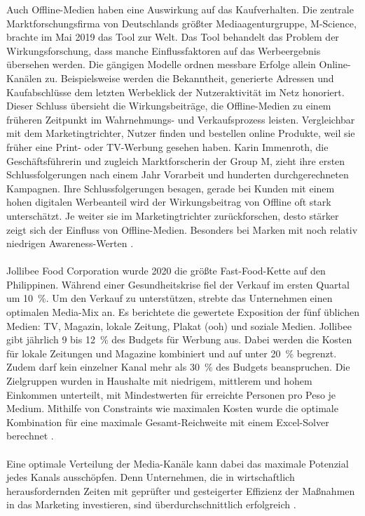 Auch Offline-Medien haben eine Auswirkung auf das Kaufverhalten. Die zentrale Marktforschungsfirma von Deutschlands größter Mediaagenturgruppe, M-Science, brachte im Mai 2019 das Tool  zur Welt. Das Tool behandelt das Problem der Wirkungsforschung, dass manche Einflussfaktoren auf das Werbeergebnis übersehen werden. Die gängigen Modelle ordnen messbare Erfolge allein Online-Kanälen zu. Beispielsweise werden die Bekanntheit, generierte Adressen und Kaufabschlüsse dem letzten Werbeklick der Nutzeraktivität im Netz honoriert. Dieser Schluss übersieht die Wirkungsbeiträge, die Offline-Medien zu einem früheren Zeitpunkt im Wahrnehmungs- und Verkaufsprozess leisten. Vergleichbar mit dem Marketingtrichter, Nutzer finden und bestellen online Produkte, weil sie früher eine Print- oder TV-Werbung gesehen haben. Karin Immenroth, die Geschäftsführerin und zugleich Marktforscherin der Group M, zieht ihre ersten Schlussfolgerungen nach einem Jahr Vorarbeit und hunderten durchgerechneten Kampagnen. Ihre Schlussfolgerungen besagen, gerade bei Kunden mit einem hohen digitalen Werbeanteil wird der Wirkungsbeitrag von Offline oft stark unterschätzt. Je weiter sie im Marketingtrichter zurückforschen, desto stärker zeigt sich der Einfluss von Offline-Medien. Besonders bei Marken mit noch relativ niedrigen Awareness-Werten \cite[S. 4]{20190411492848}.
\\\\
Jollibee Food Corporation wurde 2020 die größte Fast-Food-Kette auf den Philippinen. Während einer Gesundheitskrise fiel der Verkauf im ersten Quartal um 10~\%. Um den Verkauf zu unterstützen, strebte das Unternehmen einen optimalen Media-Mix an. Es berichtete die gewertete Exposition der fünf üblichen Medien: TV, Magazin, lokale Zeitung, Plakat (\ac{ooh}) und soziale Medien. Jollibee gibt jährlich 9 bis 12~\% des Budgets für Werbung aus. Dabei werden die Kosten für lokale Zeitungen und Magazine kombiniert und auf unter 20~\% begrenzt. Zudem darf kein einzelner Kanal mehr als 30~\% des Budgets beanspruchen. Die Zielgruppen wurden in Haushalte mit niedrigem, mittlerem und hohem Einkommen unterteilt, mit Mindestwerten für erreichte Personen pro Peso je Medium. Mithilfe von Constraints wie maximalen Kosten wurde die optimale Kombination für eine maximale Gesamt-Reichweite mit einem Excel-Solver berechnet \cite{Tapiceria2020}. \\\\
Eine optimale Verteilung der Media-Kanäle kann dabei das maximale Potenzial jedes Kanals ausschöpfen. Denn Unternehmen, die in wirtschaftlich herausfordernden Zeiten mit geprüfter und gesteigerter Effizienz der Maßnahmen in das Marketing investieren, sind überdurchschnittlich erfolgreich \cite{237097}. \\\\ 

